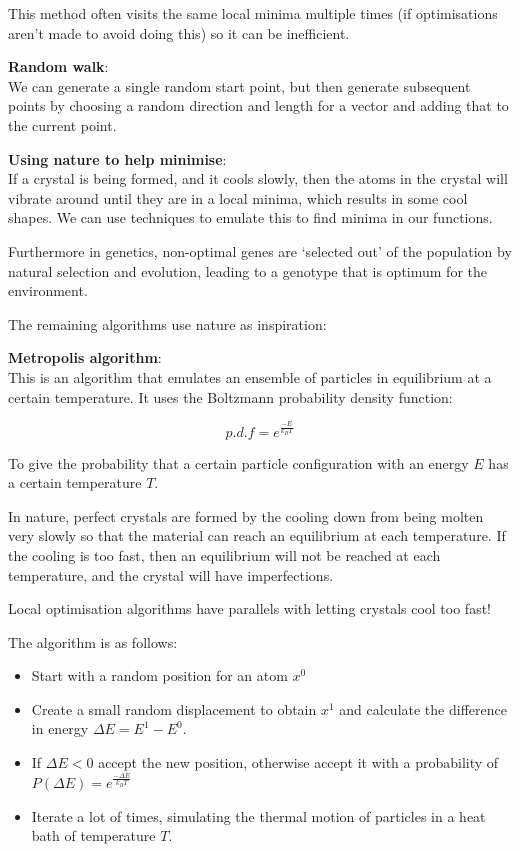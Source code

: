 \begin{description}
  This method often visits the same local minima multiple times (if
  optimisations aren't made to avoid doing this) so it can be inefficient.

  \item \textbf{Random walk}:\\
  We can generate a single random start point, but then generate subsequent
  points by choosing a random direction and length for a vector and adding that
  to the current point.

  \item \textbf{Using nature to help minimise}:\\
  If a crystal is being formed, and it cools slowly, then the atoms in the
  crystal will vibrate around until they are in a local minima, which results in
  some cool shapes. We can use techniques to emulate this to find minima in our
  functions.

  Furthermore in genetics, non-optimal genes are `selected out' of the
  population by natural selection and evolution, leading to a genotype that is
  optimum for the environment.

  The remaining algorithms use nature as inspiration:

  \begin{description}
    \item \textbf{Metropolis algorithm}:\\
      This is an algorithm that emulates an ensemble of particles in equilibrium
      at a certain temperature. It uses the Boltzmann probability density
      function:

      \[
        p.d.f = e^{\frac{-E}{k_BT}}
      \]

      To give the probability that a certain particle configuration with an 
      energy $E$ has a certain temperature $T$.

      In nature, perfect crystals are formed by the cooling down from being
      molten very slowly so that the material can reach an equilibrium at each
      temperature. If the cooling is too fast, then an equilibrium will not be
      reached at each temperature, and the crystal will have imperfections.

      Local optimisation algorithms have parallels with letting crystals cool
      too fast!

      The algorithm is as follows:

      \begin{itemize}
        \item Start with a random position for an atom $x^0$
        \item Create a small random displacement to obtain $x^1$ and calculate
        the difference in energy $\Delta E = E^1 - E^0$.
        \item If $\Delta E < 0$ accept the new position, otherwise accept it
        with a probability of $P(\Delta E) = e^{\frac{-\Delta E}{k_BT}}$
        \item Iterate a lot of times, simulating the thermal motion of particles 
        in a heat bath of temperature $T$.
      \end{itemize}


\end{description}
\end{description}
